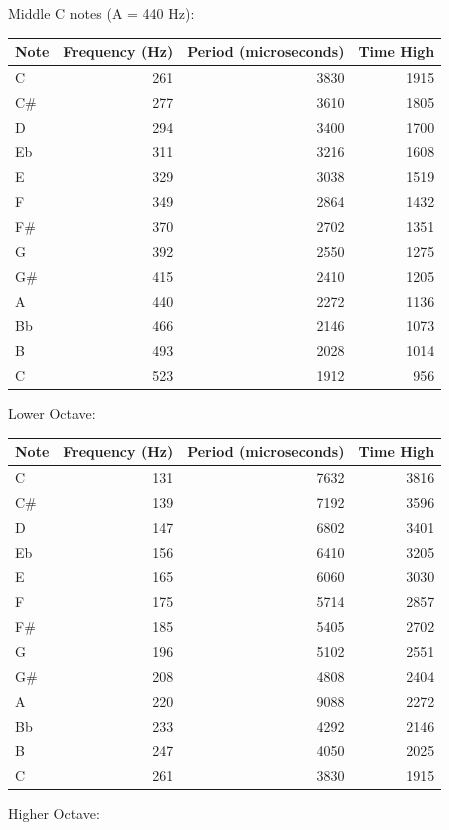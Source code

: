 \documentclass[11pt]{article}
\begin{document}
Middle C notes (A = 440 Hz):

\begin{center}
\begin{tabular}{lrrr}
Note & Frequency (Hz) & Period (microseconds) & Time High\\
\hline
C & 261 & 3830 & 1915\\
C\# & 277 & 3610 & 1805\\
D & 294 & 3400 & 1700\\
Eb & 311 & 3216 & 1608\\
E & 329 & 3038 & 1519\\
F & 349 & 2864 & 1432\\
F\# & 370 & 2702 & 1351\\
G & 392 & 2550 & 1275\\
G\# & 415 & 2410 & 1205\\
A & 440 & 2272 & 1136\\
Bb & 466 & 2146 & 1073\\
B & 493 & 2028 & 1014\\
C & 523 & 1912 & 956\\
\end{tabular}
\end{center}


Lower Octave:

\begin{center}
\begin{tabular}{lrrr}
Note & Frequency (Hz) & Period (microseconds) & Time High\\
\hline
C & 131 & 7632 & 3816\\
C\# & 139 & 7192 & 3596\\
D & 147 & 6802 & 3401\\
Eb & 156 & 6410 & 3205\\
E & 165 & 6060 & 3030\\
F & 175 & 5714 & 2857\\
F\# & 185 & 5405 & 2702\\
G & 196 & 5102 & 2551\\
G\# & 208 & 4808 & 2404\\
A & 220 & 9088 & 2272\\
Bb & 233 & 4292 & 2146\\
B & 247 & 4050 & 2025\\
C & 261 & 3830 & 1915\\
\end{tabular}
\end{center}


Higher Octave:
\end{document}
